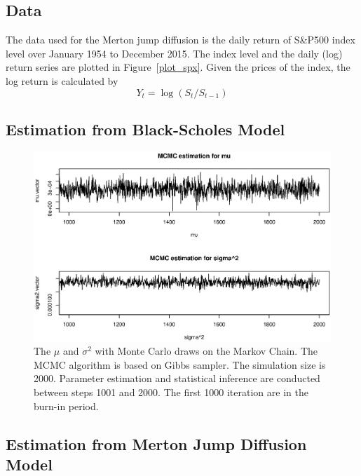 \documentclass[11pt,reqno,final]{amsart}
\begin{document}
\subsection{Data}
The data used for the Merton jump diffusion is the daily return of S\&P500 index level over January 1954 to December 2015. The index level and the daily (log) return series are plotted in Figure~\ref{plot_spx}. Given the prices of the index, the log return is calculated by
$$
Y_t = \log(S_{t}/S_{t-1})
$$

\subsection{Estimation from Black-Scholes Model}

\begin{figure}[H]
  \centering
  \includegraphics[scale=0.6]{mu_sigma_bs.eps}
  \caption{The $\mu$ and $\sigma^2$ with Monte Carlo draws on the Markov Chain. The MCMC algorithm is based on Gibbs sampler. The simulation size is 2000. Parameter estimation and statistical inference are conducted between steps 1001 and 2000. The first 1000 iteration are in the burn-in period.}\label{mu_sigma_bs}
\end{figure}

\subsection{Estimation from Merton Jump Diffusion Model}
\end{document}
